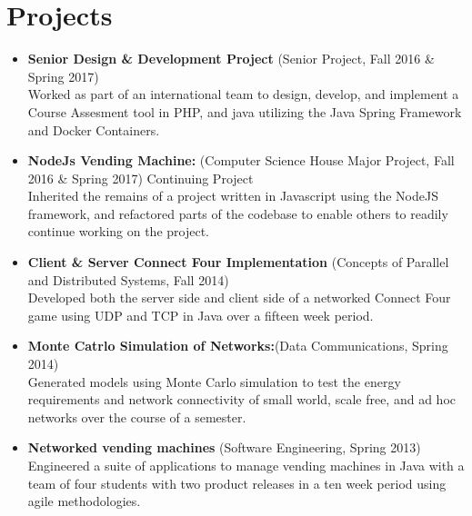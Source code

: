 \documentclass[10pt]{Article}
\begin{document}
\section*{Projects}
\begin{itemize}[topsep=1ex, itemsep=.5ex, parsep=0ex, partopsep=.75ex]
	\item[]{\bf Senior Design \& Development Project} (Senior Project, Fall 2016 \& Spring 2017)\\
	Worked as part of an international team to design, develop, and implement a Course Assesment tool in PHP, and java utilizing the Java Spring Framework and Docker Containers.
	\item[]{\bf NodeJs Vending Machine:} (Computer Science House Major Project, Fall 2016 \& Spring 2017) Continuing Project\\
	Inherited the remains of a project written in Javascript using the NodeJS framework, and refactored parts of the codebase to enable others to readily continue working on the project.
	\item[]{\bf Client \& Server Connect Four Implementation} (Concepts of Parallel and Distributed Systems, Fall 2014)\\
  Developed both the server side and client side of a networked Connect Four game using UDP and TCP in Java over a fifteen week period.
	\item[]{\bf Monte Catrlo Simulation of Networks:}(Data Communications, Spring 2014)\\
	Generated models using Monte Carlo simulation to test the energy requirements and network connectivity of small world, scale free, and ad hoc networks over the course of a semester.
	\item[]{\bf Networked vending machines} (Software Engineering, Spring 2013)\\
	Engineered a suite of applications to manage vending machines in Java with a team of four students with two product releases in a ten week period using agile methodologies.
\end{itemize}
\end{document}
